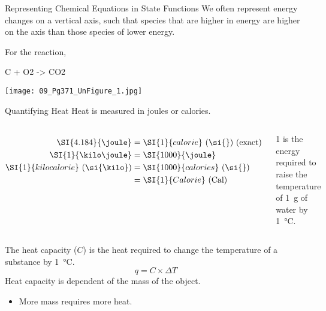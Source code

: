\documentclass[11pt,letterpaper]{article}
\begin{document}
\begin{frame}{Representing Chemical Equations in State Functions}
	We often represent energy changes on a vertical axis, such that species
	that are higher in energy are higher on the axis than those species of
	lower energy.

	\bigskip

	For the reaction,
	\begin{reaction*}
		C\sld[graphite]{} + O2\gas{} -> CO2\gas{}
	\end{reaction*}

	\bigskip

	\begin{overprint}
	\begin{center}
		{\texttt{[image: 09\_Pg371\_UnFigure\_1.jpg]}}
	\end{center}
	\end{overprint}
\end{frame}

\begin{frame}{Quantifying Heat}
	Heat is measured in \alert{joules} or \alert{calories}.
	\begin{columns}
		\begin{align*}
			\SI{4.184}{\joule} &= \SI{1}{calorie}~\text{(\si{\cal})
			(exact)}
			\\
			\SI{1}{\kilo\joule} &= \SI{1000}{\joule} \\
			\SI{1}{kilocalorie}~\text{(\si{\kilo\cal})} &=
			\SI{1000}{calories}~\text{(\si{\cal})} \\
			&= \SI{1}{Calorie}~\text{(Cal)}
		\end{align*}
		\begin{framed}
		\SI{1}{\cal} is the energy required to raise the temperature of
		\SI{1}{\gram} of water by \SI{1}{\celsius}.
		\end{framed}
	\end{columns}

	\pause

	\bigskip

	The \alert{heat capacity} ($C$) is the heat required to change the
	temperature of a substance by \SI{1}{\celsius}.
	\begin{equation*}
		q = C \times \Delta T
	\end{equation*}
	Heat capacity is \alert{dependent} of the mass of the object.
	\begin{itemize}
		\item More mass requires more heat.
	\end{itemize}
\end{frame}
\end{document}
